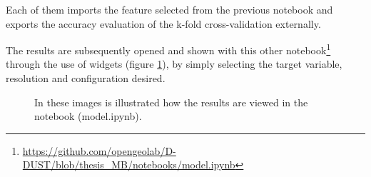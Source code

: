 Each of them imports the feature selected from the previous notebook and exports the accuracy evaluation of the k-fold cross-validation externally. \par
The results are subsequently opened and shown with
this other notebook\footnote{\url{https://github.com/opengeolab/D-DUST/blob/thesis_MB/notebooks/model.ipynb}} through the use of widgets (figure \ref{fig:view}), by simply  selecting the target variable, resolution and configuration desired.
\begin{figure}[H] 
    \centering
    \hfill%
    \caption{In these images is illustrated how the results are viewed in the notebook (model.ipynb).}
    \label{fig:view}
\end{figure}

